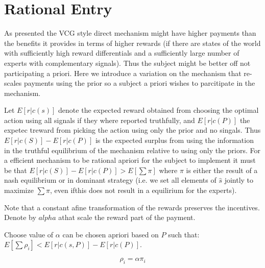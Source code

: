 \section{Rational Entry}

As presented the VCG style direct mechanism might have higher payments than the benefits it provides in terms of higher rewards (if there are states of the world with sufficiently high reward differentials and a sufficiently large number of experts with complementary signals). Thus the subject might be better off not participating a priori. Here we introduce a variation on the mechanism that re-scales payments using the prior so a subject a priori wishes to parcitipate in the mechanism.



Let $E[r|c(s)]$ denote the expected reward obtained from choosing the optimal action using all signals if they where reported truthfully, and $E[r|c(P)] $ the expetec treward from picking the action using only the prior and no singals. Thus $E[r|c(S)] - E[r|c(P)] $ is the expected surplus from using the information in the truthful equilibrium of the mechanism relative to using only the priors. For a efficient mechanism to be rational apriori for the subject to implement it must be that $E[r|c(S)] - E[r|c(P)] > E[\sum \pi]$ where $\pi$ is either the result of a nash equilibrium or in dominant strategy (i.e. we set all elements of $\hat{s}$ jointly to maximize $\sum \pi$, even ifthis does not result in a equilirium for the experts).

Note that a constant afine transformation of the rewards preserves the incentives. Denote by $alpha$ athat scale the reward part of the payment.

\begin{mech}

Choose value of $\alpha$ can be chosen apriori based on $P$ such that: $ E[\sum \rho_i] < E[r|c(s,P)] - E[r|c(P)] $. 


\[
  \rho_i  = \alpha \pi_i
\]

\end{mech}


